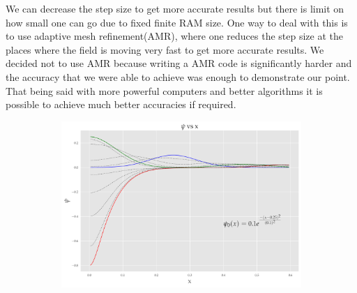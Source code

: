 We can decrease the step size to get more accurate results but there is limit on how small one can go due to fixed finite RAM size. One way to deal with this is to use adaptive mesh refinement(AMR), where one reduces the step size at the places where the field is moving very fast to get more accurate results. We decided not to use AMR because writing a AMR code is significantly harder and the accuracy that we were able to achieve was enough to demonstrate our point. That being said with more powerful computers and better algorithms it is possible to achieve much better accuracies if required.



\begin{figure}
    \centering
    \begin{subfigure}[b]{0.85\textwidth}
        \includegraphics[width=1\linewidth]{images/super_Gaussian.pdf}
        \caption{}
        \label{fig:Ng1}
    \end{subfigure}


\end{figure}
